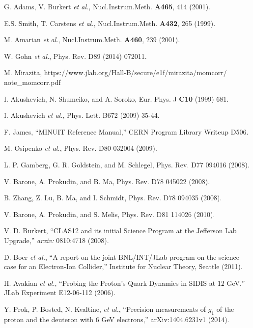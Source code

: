 \begin{thebibliography}{99}
	G. Adams, V. Burkert \emph{et al.}, Nucl.Instrum.Meth. \textbf{A465}, 414 (2001).

	E.S. Smith, T. Carstens \emph{et al.}, Nucl.Instrum.Meth. \textbf{A432}, 265 (1999).

	M. Amarian \emph{et al.}, Nucl.Instrum.Meth. \textbf{A460}, 239 (2001).

	W. Gohn \emph{et al.}, Phys. Rev. D89 (2014) 072011.

	M. Mirazita, https://www.jlab.org/Hall-B/secure/e1f/mirazita/momcorr/\\note\_momcorr.pdf

	I. Akushevich, N. Shumeiko, and A. Soroko, Eur. Phys. J \textbf{C10} (1999) 681.

	I. Akushevich \emph{et al.}, Phys. Lett. B672 (2009) 35-44.

	F. James, ``MINUIT Reference Manual,'' CERN Program Library Writeup D506.

	M. Osipenko \emph{et al.}, Phys. Rev. D80 032004 (2009).

	L. P. Gamberg, G. R. Goldstein, and M. Schlegel, Phys. Rev. D77 094016 (2008).

	V. Barone, A. Prokudin, and B. Ma, Phys. Rev. D78 045022 (2008).

	B. Zhang, Z. Lu, B. Ma, and I. Schmidt, Phys. Rev. D78 094035 (2008).

	V. Barone, A. Prokudin, and S. Melis, Phys. Rev. D81 114026 (2010).

	V. D. Burkert, ``CLAS12 and its initial Science Program at the Jefferson Lab Upgrade,'' \emph{arxiv:} 0810:4718 (2008).

	D. Boer \emph{et al.}, ``A report on the joint BNL/INT/JLab program on the science case for an Electron-Ion Collider,''
	Institute for Nuclear Theory, Seattle (2011).

	H. Avakian \emph{et al.}, ``Probing the Proton's Quark Dynamics in SIDIS at 12 GeV,'' JLab Experiment E12-06-112 (2006).

	Y. Prok, P. Bosted, N. Kvaltine, \emph{et al.}, ``Precision measurements of $g_1$ of the proton and the deuteron with 6 GeV electrons,'' arXiv:1404.6231v1 (2014).

\end{thebibliography}

